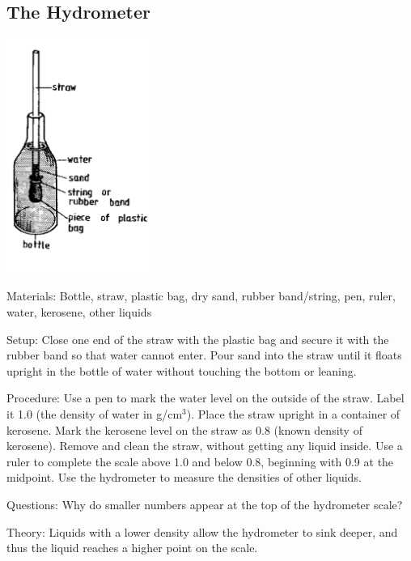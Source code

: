 \begin{multicols}{2}
\subsection{The Hydrometer}

\begin{center}
\includegraphics[width=0.35\textwidth]{./img/source/hydrometer.png}
\end{center}

\begin{description*}
\item[Materials:]{Bottle, straw, plastic bag, dry sand, rubber band/string, pen, ruler, water, kerosene, other liquids}
\item[Setup:]{Close one end of the straw with the plastic bag and secure it with the rubber band so that water cannot enter. Pour sand into the straw until it floats upright in the bottle of water without touching the bottom or leaning.}
\item[Procedure:]{Use a pen to mark the water level on the outside of the straw. Label it 1.0 (the density of water in g/cm$^3$). Place the straw upright in a container of kerosene. Mark the kerosene level on the straw as 0.8 (known density of kerosene). Remove and clean the straw, without getting any liquid inside. Use a ruler to complete the scale above 1.0 and below 0.8, beginning with 0.9 at the midpoint. Use the hydrometer to measure the densities of other liquids.}
\item[Questions:]{Why do smaller numbers appear at the top of the hydrometer scale?}
\item[Theory:]{Liquids with a lower density allow the hydrometer to sink deeper, and thus the liquid reaches a higher point on the scale.}
\end{description*}


\end{multicols}

\pagebreak